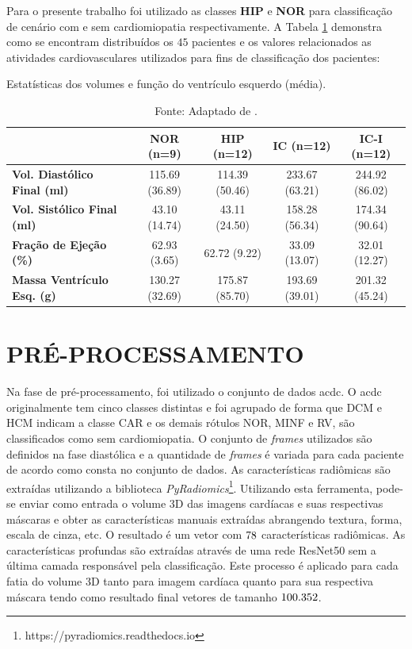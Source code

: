 \noindent Para o presente trabalho foi utilizado as classes \textbf{HIP} e \textbf{NOR} para classificação de cenário com e sem cardiomiopatia respectivamente. A Tabela \ref{tab:sunny_stats} demonstra como se encontram distribuídos os $45$ pacientes e os valores relacionados as atividades cardiovasculares utilizados para fins de classificação dos pacientes:
\newline

\begin{table}[h!]
\centering
\caption{Estatísticas dos volumes e função do ventrículo esquerdo (média).}
\begin{tabular}{@{}lcccc@{}}
\toprule
\textbf{}  & \textbf{NOR (n=9)} & \textbf{HIP (n=12)} & \textbf{IC (n=12)} & \textbf{IC-I (n=12)} \\ \midrule
\textbf{Vol. Diastólico Final (ml)} & 115.69 (36.89)   & 114.39 (50.46)      & 233.67 (63.21)     & 244.92 (86.02)       \\
\textbf{Vol. Sistólico Final (ml)}  & 43.10 (14.74)    & 43.11 (24.50)       & 158.28 (56.34)     & 174.34 (90.64)       \\
\textbf{Fração de Ejeção (\%)}        & 62.93 (3.65)     & 62.72 (9.22)        & 33.09 (13.07)      & 32.01 (12.27)        \\
\textbf{Massa Ventrículo Esq. (g)} & 130.27 (32.69)   & 175.87 (85.70)      & 193.69 (39.01)     & 201.32 (45.24)       \\ \bottomrule
\end{tabular}
\caption*{Fonte: Adaptado de \cite{radauEvaluationFrameworkAlgorithms2009}.}
\label{tab:sunny_stats}
\end{table}

\section{PRÉ-PROCESSAMENTO}
\label{subsec:cap4_preprocess}

Na fase de pré-processamento, foi utilizado o conjunto de dados \gls{acdc}. O \gls{acdc} originalmente tem cinco classes distintas e foi agrupado de forma que DCM e HCM indicam a classe CAR e os demais rótulos NOR, MINF e RV, são classificados como sem cardiomiopatia. O conjunto de \textit{frames} utilizados são definidos na fase diastólica e a quantidade de \textit{frames} é variada para cada paciente de acordo como consta no conjunto de dados. As características radiômicas são extraídas utilizando a biblioteca \textit{PyRadiomics}\footnote{https://pyradiomics.readthedocs.io}. Utilizando esta ferramenta, pode-se enviar como entrada o volume 3D das imagens cardíacas e suas respectivas máscaras e obter as características manuais extraídas abrangendo textura, forma, escala de cinza, etc. O resultado é um vetor com $78$ características radiômicas. As características profundas são extraídas através de uma rede ResNet50 sem a última camada responsável pela classificação. Este processo é aplicado para cada fatia do volume 3D tanto para imagem cardíaca quanto para sua respectiva máscara tendo como resultado final vetores de tamanho $100.352$. 


